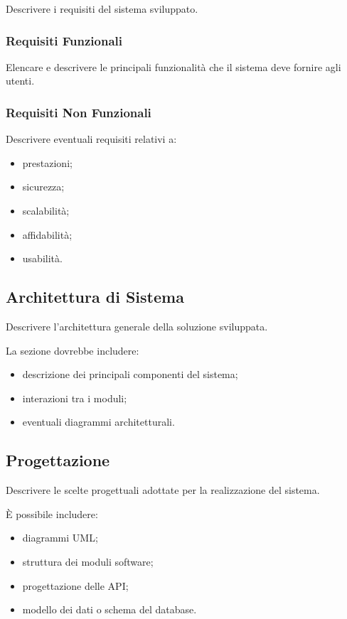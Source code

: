 Descrivere i requisiti del sistema sviluppato.

\subsubsection{Requisiti Funzionali}

Elencare e descrivere le principali funzionalità che il sistema deve
fornire agli utenti.

\subsubsection{Requisiti Non Funzionali}

Descrivere eventuali requisiti relativi a:

\begin{itemize}
\item prestazioni;
\item sicurezza;
\item scalabilità;
\item affidabilità;
\item usabilità.
\end{itemize}

\subsection{Architettura di Sistema}

Descrivere l’architettura generale della soluzione sviluppata.

La sezione dovrebbe includere:

\begin{itemize}
\item descrizione dei principali componenti del sistema;
\item interazioni tra i moduli;
\item eventuali diagrammi architetturali.
\end{itemize}

\subsection{Progettazione}

Descrivere le scelte progettuali adottate per la realizzazione del sistema.

È possibile includere:

\begin{itemize}
\item diagrammi UML;
\item struttura dei moduli software;
\item progettazione delle API;
\item modello dei dati o schema del database.
\end{itemize}

